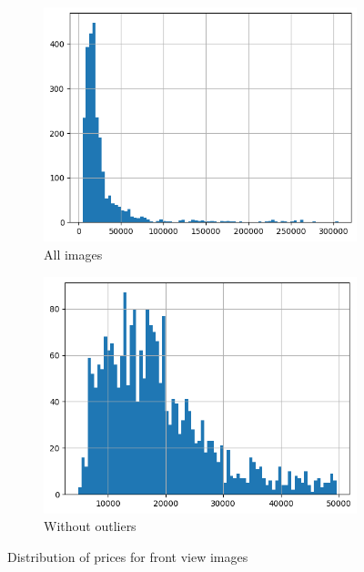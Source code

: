 \documentclass[12pt]{article}
\begin{document}
\begin{figure}[ht] 
    \centering

    \begin{subfigure}[b]{0.35\textwidth} 
        \includegraphics[width=\textwidth]{price_image_distribution_1.png}
        \caption{All images}
        \label{fig:image1}
    \end{subfigure}
    \begin{subfigure}[b]{0.35\textwidth}
        \includegraphics[width=\textwidth]{price_image_distribution_2.png}
        \caption{Without outliers}
        \label{fig:image2}
    \end{subfigure}

    \caption{Distribution of prices for front view images}
    \label{fig:Price distribution}
\end{figure}
\end{document}

